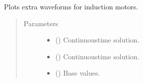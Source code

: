 \documentclass[letterpaper,10pt,english]{sphinxmanual}
\begin{document}
\begin{fulllineitems}
\label{\detokenize{helpers:helpers.plot_im_extra}}
\pysigstartsignatures
{}
\pysigstopsignatures
\sphinxAtStartPar
Plots extra waveforms for induction motors.
\begin{quote}\begin{description}
\item[{Parameters}] \leavevmode\begin{itemize}
\item {} 
\sphinxAtStartPar
{} () \textendash{} Continuous\sphinxhyphen{}time solution.

\item {} 
\sphinxAtStartPar
{} () \textendash{} Continuous\sphinxhyphen{}time solution.

\item {} 
\sphinxAtStartPar
{} () \textendash{} Base values.

\end{itemize}

\end{description}\end{quote}

\end{fulllineitems}

\end{document}
